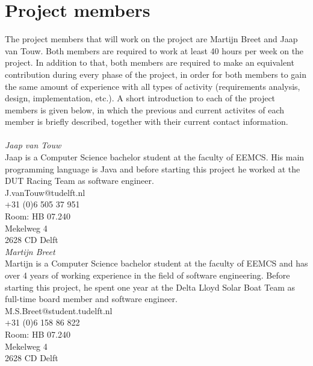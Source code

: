 \section{Project members}
The project members that will work on the project are Martijn Breet and Jaap van Touw. Both members are required to work at least 40 hours per week on the project. In addition to that, both members are required to make an equivalent contribution during every phase of the project, in order for both members to gain the same amount of experience with all types of activity (requirements analysis, design, implementation, etc.). A short introduction to each of the project members is given below, in which the previous and current activites of each member is briefly described, together with their current contact information.\\
\noindent\\
\textit{Jaap van Touw}\\
Jaap is a Computer Science bachelor student at the faculty of EEMCS. His main programming language is Java and before starting this project he worked at the DUT Racing Team as software engineer.\\

\noindent
J.vanTouw@tudelft.nl\\
+31 (0)6 505 37 951\\
Room: HB 07.240\\
Mekelweg 4\\
2628 CD Delft\\

\noindent
\textit{Martijn Breet}\\
Martijn is a Computer Science bachelor student at the faculty of EEMCS and has over 4 years of working experience in the field of software engineering.  Before starting this project, he spent one year at the Delta Lloyd Solar Boat Team as full-time board member and software engineer.\\

\noindent
M.S.Breet@student.tudelft.nl \\
+31 (0)6 158 86 822\\
Room: HB 07.240\\
Mekelweg 4\\
2628 CD Delft\\
